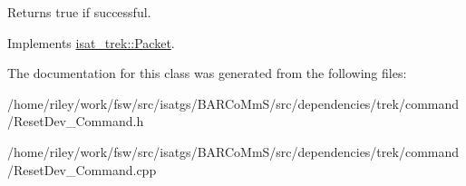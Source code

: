 \begin{DoxyReturn}{Returns}
true if successful. 
\end{DoxyReturn}


Implements \hyperlink{classisat__trek_1_1_packet}{isat\+\_\+trek\+::\+Packet}.



The documentation for this class was generated from the following files\+:\begin{DoxyCompactItemize}
\item 
/home/riley/work/fsw/src/isatgs/\+B\+A\+R\+Co\+Mm\+S/src/dependencies/trek/command/Reset\+Dev\+\_\+\+Command.\+h\item 
/home/riley/work/fsw/src/isatgs/\+B\+A\+R\+Co\+Mm\+S/src/dependencies/trek/command/Reset\+Dev\+\_\+\+Command.\+cpp\end{DoxyCompactItemize}
